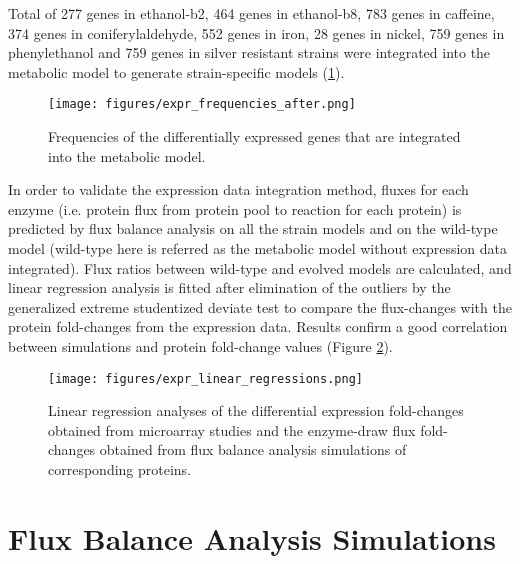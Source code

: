 Total of 277 genes in ethanol-b2, 464 genes in ethanol-b8, 783 genes in caffeine, 374 genes in coniferylaldehyde, 552 genes in iron, 28 genes in nickel, 759 genes in phenylethanol and 759 genes in silver resistant strains were integrated into the metabolic model to generate strain-specific models (\ref{fig:expr_frequencies_after}).

\begin{figure}[H]
  \begin{center}
  \texttt{[image: figures/expr\_frequencies\_after.png]}
  \caption[Frequencies of the differentially expressed genes that are integrated into the metabolic model]{Frequencies of the differentially expressed genes that are integrated into the metabolic model.}
  \label{fig:expr_frequencies_after}
  \end{center}
\end{figure}

In order to validate the expression data integration method, fluxes for each enzyme (i.e. protein flux from protein pool to reaction for each protein) is predicted by flux balance analysis on all the strain models and on the wild-type model (wild-type here is referred as the metabolic model without expression data integrated). Flux ratios between wild-type and evolved models are calculated, and linear regression analysis is fitted after elimination of the outliers by the generalized extreme studentized deviate test to compare the flux-changes with the protein fold-changes from the expression data. Results confirm a good correlation between simulations and protein fold-change values (Figure \ref{fig:expr_linear_regressions}).

\begin{figure}[H]
  \begin{center}
  \texttt{[image: figures/expr\_linear\_regressions.png]}
  \caption[Linear regression analyses of the fold-changes]{Linear regression analyses of the differential expression fold-changes obtained from microarray studies and the enzyme-draw flux fold-changes obtained from flux balance analysis simulations of corresponding proteins.}
  \label{fig:expr_linear_regressions}
  \end{center}
\end{figure}



\section{Flux Balance Analysis Simulations}

